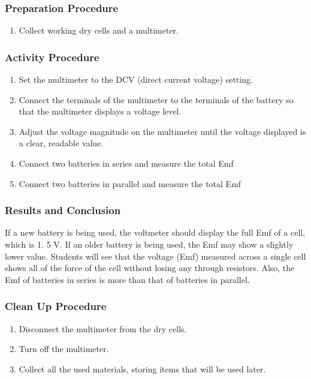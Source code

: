 \subsubsection*{Preparation Procedure}
\begin{enumerate}
\item{Collect working dry cells and a multimeter.} 
\end{enumerate}

\subsubsection*{Activity Procedure}
\begin{enumerate}
\item{Set the multimeter to the DCV (direct current voltage) setting.} 
\item{Connect the terminals of the multimeter to the terminals of the battery so that the multimeter displays a voltage level.} 
\item{Adjust the voltage magnitude on the multimeter until the voltage displayed is a clear, readable value.} 
\item{Connect two batteries in series and measure the total Emf}
\item{Connect two batteries in parallel and measure the total Emf}
\end{enumerate}

\subsubsection*{Results and Conclusion}
If a new battery is being used, the voltmeter should display the full Emf of a cell, which is 1. 5 V. If an older battery is being used, the Emf may show a slightly lower value. Students will see that the voltage (Emf) measured across a single cell shows all of the force of the cell without losing any through resistors. Also, the Emf of batteries in series is more than that of batteries in parallel.

\subsubsection*{Clean Up Procedure}
\begin{enumerate}
\item{Disconnect the multimeter from the dry cells.} 
\item{Turn off the multimeter.} 
\item{Collect all the used materials, storing items that will be used later.} 
\end{enumerate}

